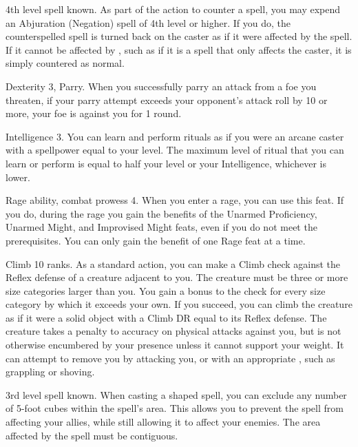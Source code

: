\featpre 4th level spell known.
\featben As part of the action to counter a spell, you may expend an Abjuration (Negation) spell of 4th level or higher.
If you do, the counterspelled spell is turned back on the caster as if it were affected by the 
spell.
If it cannot be affected by , such as if it is a spell that only affects the caster, it is simply countered as normal.

\featpres Dexterity 3, Parry.
\featben When you successfully parry an attack from a foe you threaten, if your parry attempt exceeds your opponent's attack roll by 10 or more, your foe is  against you for 1 round.

\featpre Intelligence 3.
\featben You can learn and perform rituals as if you were an arcane caster with a spellpower equal to your level.
The maximum level of ritual that you can learn or perform is equal to half your level or your Intelligence, whichever is lower.

\featpres Rage ability, combat prowess 4.
\featben When you enter a rage, you can use this feat.
If you do, during the rage you gain the benefits of the Unarmed Proficiency, Unarmed Might, and Improvised Might feats, even if you do not meet the prerequisites.
 You can only gain the benefit of one Rage feat at a time.

\featpre Climb 10 ranks.
\featben As a standard action, you can make a Climb check against the Reflex defense of a creature adjacent to you.
The creature must be three or more size categories larger than you.
You gain a  bonus to the check for every size category by which it exceeds your own.
If you succeed, you can climb the creature as if it were a solid object with a Climb DR equal to its Reflex defense.
The creature takes a  penalty to accuracy on physical attacks against you, but is not otherwise encumbered by your presence unless it cannot support your weight.
It can attempt to remove you by attacking you, or with an appropriate , such as grappling or shoving.

\featpre 3rd level spell known.
\featben When casting a shaped spell, you can exclude any number of 5-foot cubes within the spell's area.
This allows you to prevent the spell from affecting your allies, while still allowing it to affect your enemies.
The area affected by the spell must be contiguous.

